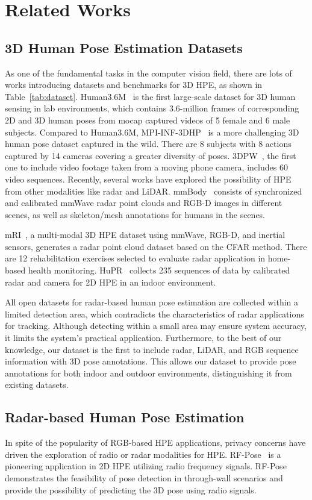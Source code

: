 \section{Related Works}

\subsection{3D Human Pose Estimation Datasets}
As one of the fundamental tasks in the computer vision field, there are lots of works introducing datasets and benchmarks for 3D HPE, as shown in Table~\ref{tab:dataset}. Human3.6M~\cite{ionescu2013human3} is the first large-scale dataset for 3D human sensing in lab environments, which contains 3.6-million frames of corresponding 2D and 3D human poses from mocap captured videos of 5 female and 6 male subjects. Compared to Human3.6M, MPI-INF-3DHP~\cite{mehta2017monocular} is a more challenging 3D human pose dataset captured in the wild. There are 8 subjects with 8 actions captured by 14 cameras covering a greater diversity of poses. 3DPW~\cite{von2018recovering},  the first one to include video footage taken from a moving phone camera, includes 60 video sequences. Recently, several works have explored the possibility of HPE from other modalities like radar and LiDAR. mmBody~\cite{chen2022mmbody} consists of synchronized and calibrated mmWave radar point clouds and RGB-D images in different scenes, as well as skeleton/mesh annotations for humans in the scenes. 

mRI~\cite{NEURIPS2022_af9c9c6d}, a multi-modal 3D HPE dataset using mmWave, RGB-D, and inertial sensors, generates a radar point cloud dataset based on the CFAR method. There are 12 rehabilitation exercises selected to evaluate radar application in home-based health monitoring. 
HuPR~\cite{lee2023hupr} collects 235 sequences of data by calibrated radar and camera for 2D HPE in an indoor environment. 

All open datasets for radar-based human pose estimation are collected within a limited detection area, which contradicts the characteristics of radar applications for tracking. Although detecting within a small area may ensure system accuracy, it limits the system's practical application.
Furthermore, to the best of our knowledge, our dataset is the first to include radar, LiDAR, and RGB sequence information with 3D pose annotations. This allows our dataset to provide pose annotations for both indoor and outdoor environments, distinguishing it from existing datasets.

\subsection{Radar-based Human Pose Estimation}
In spite of the popularity of RGB-based HPE applications, privacy concerns have driven the exploration of radio or radar modalities for HPE. RF-Pose~\cite{zhao2018through} is a pioneering application in 2D HPE utilizing radio frequency signals. RF-Pose demonstrates the feasibility of pose detection in through-wall scenarios and provide the possibility of predicting the 3D pose using radio signals.

